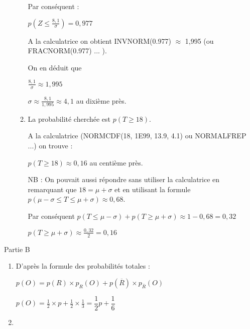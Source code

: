 \begin{corrige}
\begin{enumerate}
\begin{enumerate}[label=\alph*.]
               Par conséquent :
               \par
               $ p\left(Z\leqslant \frac{8,1}{\sigma}\right)=0,977$
               \par
               A la calculatrice on obtient INVNORM(0.977) $\approx $ 1,995 (ou FRACNORM(0.977)  ... ).
               \par
               On en déduit que
               \par
               $\frac{8,1}{\sigma}\approx 1,995$
               \par
               $\sigma\approx \frac{8,1}{1,995} \approx 4,1$ au dixième près.
               \item
               La probabilité cherchée est $p(T \geqslant 18)$.
               \par
               A la calculatrice (NORMCDF(18, 1E99, 13.9, 4.1) ou NORMALFREP ...) on trouve :
               \par
               $p(T \geqslant 18) \approx 0,16$ au centième près.
               \par
               NB : On pouvait aussi répondre sans utiliser la calculatrice en remarquant que $18=\mu+\sigma$ et en utilisant la formule $p(\mu-\sigma \leqslant T \leqslant \mu+\sigma)\approx 0,68$.
               \par
               Par conséquent $p(T \leqslant \mu-\sigma) + p(T \geqslant \mu+\sigma)\approx 1-0,68 = 0,32$
               \par
               $p(T \geqslant \mu+\sigma)\approx \frac{0,32}{2}=0,16$
          \end{enumerate}
     \end{enumerate}
     \begin{h3}Partie B\end{h3}
     \begin{enumerate}
          \item
\begin{center}
\end{center}
          D'après la formule des probabilités totales :
          \par
          $p(O)=p(R)\times p_R(O)+p(\overline{R})\times p_{\overline{R}}(O)$
          \par
          $p(O)=\frac{1}{2}\times p+\frac{1}{2} \times \frac{1}{3}= \dfrac{1}{2}p+\dfrac{1}{6}$
          \item

\end{enumerate}
\end{corrige}
